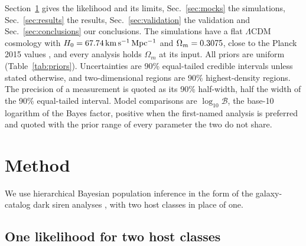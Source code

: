 \documentclass[aps,prd,reprint,twocolumn,superscriptaddress,nofootinbib,floatfix,nolongbibliography]{revtex4-2}
\newcommand{\kms}{{\rm km\,s^{-1}\,Mpc^{-1}}}
\newcommand{\lB}{\log_{10}\mathcal{B}}
\begin{document}
Section~\ref{sec:method} gives the likelihood and its limits,
Sec.~\ref{sec:mocks} the simulations, Sec.~\ref{sec:results} the results,
Sec.~\ref{sec:validation} the validation and Sec.~\ref{sec:conclusions} our
conclusions. The simulations have a flat
$\Lambda$CDM cosmology with $H_0=\MockHzero\,\kms$ and
$\Omega_m=0.3075$, close to the Planck 2015 values
\cite{Planck:2015fie}, and every analysis holds $\Omega_m$ at its input. All
priors are uniform (Table~\ref{tab:priors}). Uncertainties are 90\%
equal-tailed credible intervals unless stated otherwise, and two-dimensional
regions are 90\% highest-density regions. The precision of a measurement is
quoted as its 90\% half-width, half the width of the 90\% equal-tailed
interval. Model comparisons are $\lB$, the base-10 logarithm of the Bayes
factor,
positive when the first-named
analysis is preferred and quoted with the prior range of every parameter the
two do not share.

\section{Method}
\label{sec:method}

We use hierarchical Bayesian population inference
\cite{Mandel:2018mve} in the form of the
galaxy-catalog dark siren analyses
\cite{Gray:2019ksv,Gair:2022zsa,Mastrogiovanni:2023emh,Gray:2023wgj}, with
two host classes in place of one.

\subsection{One likelihood for two host classes}
\label{sec:mixture}
\end{document}
